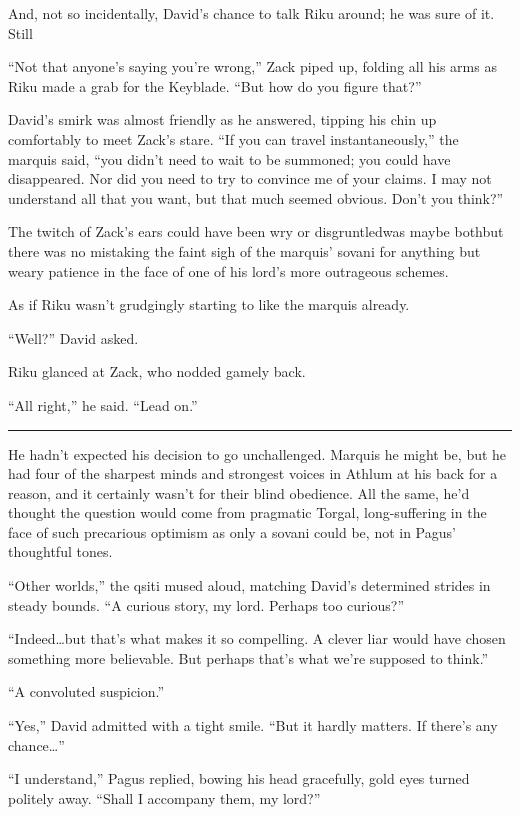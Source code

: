 And, not so incidentally, David's chance to talk Riku around; he was sure of it. Still\textemdash 

``Not that anyone's saying you're wrong,'' Zack piped up, folding all his arms as Riku made a grab for the Keyblade. ``But how do you figure that?''

David's smirk was almost friendly as he answered, tipping his chin up comfortably to meet Zack's stare. ``If you can travel instantaneously,'' the marquis said, ``you didn't need to wait to be summoned; you could have disappeared. Nor did you need to try to convince me of your claims. I may not understand all that you want, but that much seemed obvious. Don't you think?''

The twitch of Zack's ears could have been wry or disgruntled\textemdash was maybe both\textemdash but there was no mistaking the faint sigh of the marquis' sovani for anything but weary patience in the face of one of his lord's more outrageous schemes.

As if Riku wasn't grudgingly starting to like the marquis already.

``Well?'' David asked.

Riku glanced at Zack, who nodded gamely back.

``All right,'' he said. ``Lead on.''

\fancybreak{\pfbreakdisplay}


He hadn't expected his decision to go unchallenged. Marquis he might be, but he had four of the sharpest minds and strongest voices in Athlum at his back for a reason, and it certainly wasn't for their blind obedience. All the same, he'd thought the question would come from pragmatic Torgal, long-suffering in the face of such precarious optimism as only a sovani could be, not in Pagus' thoughtful tones.

``Other worlds,'' the qsiti mused aloud, matching David's determined strides in steady bounds. ``A curious story, my lord. Perhaps too curious?''

``Indeed\ldots but that's what makes it so compelling. A clever liar would have chosen something more believable. But perhaps that's what we're supposed to think.''

``A convoluted suspicion.''

``Yes,'' David admitted with a tight smile. ``But it hardly matters. If there's any chance\ldots ''

``I understand,'' Pagus replied, bowing his head gracefully, gold eyes turned politely away. ``Shall I accompany them, my lord?''

